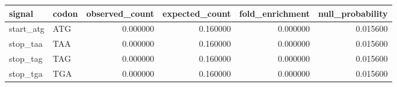 \begin{tabular}{llrrrr}
\toprule
signal & codon & observed_count & expected_count & fold_enrichment & null_probability \\
\midrule
start_atg & ATG & 0.000000 & 0.160000 & 0.000000 & 0.015600 \\
stop_taa & TAA & 0.000000 & 0.160000 & 0.000000 & 0.015600 \\
stop_tag & TAG & 0.000000 & 0.160000 & 0.000000 & 0.015600 \\
stop_tga & TGA & 0.000000 & 0.160000 & 0.000000 & 0.015600 \\
\bottomrule
\end{tabular}

